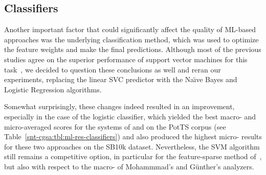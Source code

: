 \subsection{Classifiers}\label{subsec:cgsa:ml-methods:classifiers-analysis}

Another important factor that could significantly affect the quality
of ML-based approaches was the underlying classification method, which
was used to optimize the feature weights and make the final
predictions.  Although most of the previous studies agree on the
superior performance of support vector machines for this
task~\cite[see ][]{Pang:02,Gamon:04,Mohammad:13}, we decided to
question these conclusions as well and reran our experiments,
replacing the linear SVC predictor with the Na\"{\i}ve Bayes and
Logistic Regression algorithms.

Somewhat surprisingly, these changes indeed resulted in an
improvement, especially in the case of the logistic classifier, which
yielded the best macro- and micro-averaged scores for the systems of
\citet{Mohammad:13} and \citet{Guenther:14} on the PotTS corpus (see
Table~\ref{snt-cgsa:tbl:ml-res-classifiers}) and also produced the
highest micro-\F{} results for these two approaches on the SB10k
dataset.  Nevertheless, the SVM algorithm still remains a competitive
option, in particular for the feature-sparse method
of~\citet{Gamon:04}, but also with respect to the macro-\F{} of
Mohammmad's and G\"unther's analyzers.

